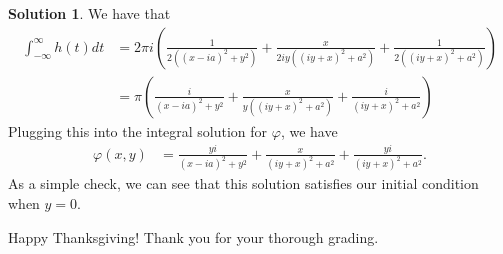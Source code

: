 \documentclass[12pt]{article}
\renewcommand{\phi}{\varphi}
\theoremstyle{definition}
\newtheorem{sol}{Solution}
\theoremstyle{remark}
\begin{document}
\begin{sol}
 We have that 
 \begin{align*}
     \int_{-\infty }^{\infty } h(t)dt &= 2\pi i(\frac{1}{2((x-ia)^{2} + y^{2})} +  \frac{x}{2iy((iy + x)^{2} + a^{2})} + \frac{1}{2 ((iy+x)^{2} + a^{2})})\\
                                      &= \pi ( \frac{i}{(x-ia)^{2} + y^{2}}  + \frac{x}{y((iy + x)^{2} + a^{2})} + \frac{i}{(iy+x)^{2} + a^{2}}) 
 \end{align*}
Plugging this into the integral solution for $\phi$, we have
\begin{align*}
  \phi(x,y) &= \frac{yi}{(x-ia)^{2} + y^{2}}  + \frac{x}{(iy + x)^{2} + a^{2}} + \frac{yi}{(iy+x)^{2} + a^{2}}.
\end{align*}
As a simple check, we can see that this solution satisfies our initial condition when $y=0$.
\end{sol}

Happy Thanksgiving! Thank you for your thorough grading.
\end{document}
